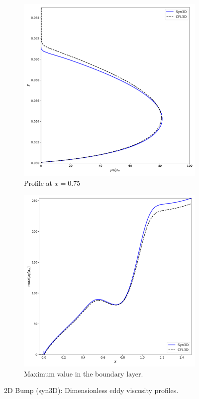 \begin{figure}[ht!]
\centering
\begin{subfigure}{.45\textwidth}
  \centering
  \includegraphics[width=1.0\textwidth]{figs/2dbump/revBL.pdf}
  \caption{Profile at $x=0.75$}
  \label{fig:syn2dbumpmutprof}
\end{subfigure}%
\begin{subfigure}{.45\textwidth}
  \centering
  \includegraphics[width=1.0\textwidth]{figs/2dbump/maxRev.pdf}
  \caption{Maximum value in the boundary layer.}
  \label{fig:syn2dbumpmaxmut}
\end{subfigure}
\caption{2D Bump (syn3D): Dimensionless eddy viscosity profiles.}
\label{fig:syn2dbumpmut}
\end{figure}

